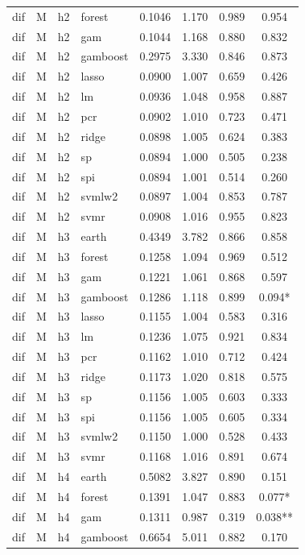 \begin{ThreePartTable}
\begin{longtable}[t]{llclcccc}
dif & M & h2 & forest & 0.1046 & 1.170 & 0.989 & 0.954\\
dif & M & h2 & gam & 0.1044 & 1.168 & 0.880 & 0.832\\
dif & M & h2 & gamboost & 0.2975 & 3.330 & 0.846 & 0.873\\
dif & M & h2 & lasso & 0.0900 & 1.007 & 0.659 & 0.426\\
dif & M & h2 & lm & 0.0936 & 1.048 & 0.958 & 0.887\\
dif & M & h2 & pcr & 0.0902 & 1.010 & 0.723 & 0.471\\
dif & M & h2 & ridge & 0.0898 & 1.005 & 0.624 & 0.383\\
dif & M & h2 & sp & 0.0894 & 1.000 & 0.505 & 0.238\\
dif & M & h2 & spi & 0.0894 & 1.001 & 0.514 & 0.260\\
dif & M & h2 & svmlw2 & 0.0897 & 1.004 & 0.853 & 0.787\\
dif & M & h2 & svmr & 0.0908 & 1.016 & 0.955 & 0.823\\
\addlinespace
dif & M & h3 & earth & 0.4349 & 3.782 & 0.866 & 0.858\\
dif & M & h3 & forest & 0.1258 & 1.094 & 0.969 & 0.512\\
dif & M & h3 & gam & 0.1221 & 1.061 & 0.868 & 0.597\\
dif & M & h3 & gamboost & 0.1286 & 1.118 & 0.899 & 0.094*\\
dif & M & h3 & lasso & 0.1155 & 1.004 & 0.583 & 0.316\\
dif & M & h3 & lm & 0.1236 & 1.075 & 0.921 & 0.834\\
dif & M & h3 & pcr & 0.1162 & 1.010 & 0.712 & 0.424\\
dif & M & h3 & ridge & 0.1173 & 1.020 & 0.818 & 0.575\\
dif & M & h3 & sp & 0.1156 & 1.005 & 0.603 & 0.333\\
dif & M & h3 & spi & 0.1156 & 1.005 & 0.605 & 0.334\\
dif & M & h3 & svmlw2 & 0.1150 & 1.000 & 0.528 & 0.433\\
dif & M & h3 & svmr & 0.1168 & 1.016 & 0.891 & 0.674\\
\addlinespace
dif & M & h4 & earth & 0.5082 & 3.827 & 0.890 & 0.151\\
dif & M & h4 & forest & 0.1391 & 1.047 & 0.883 & 0.077*\\
dif & M & h4 & gam & 0.1311 & 0.987 & 0.319 & 0.038**\\
dif & M & h4 & gamboost & 0.6654 & 5.011 & 0.882 & 0.170\\

\end{longtable}
\end{ThreePartTable}
